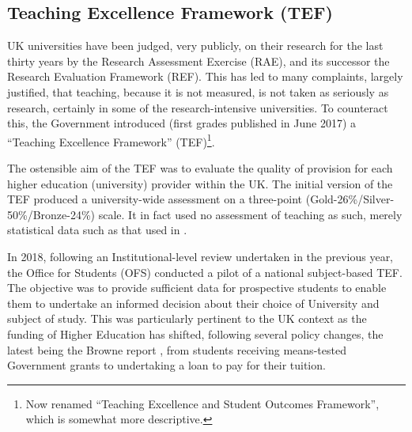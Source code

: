 \documentclass[sigconf]{acmart}
\begin{document}

\subsection{Teaching Excellence Framework (TEF)}

UK universities have been judged, very publicly, on their research
for the last thirty years by the Research Assessment Exercise (RAE), and its successor the Research Evaluation Framework (REF). This has led to many complaints, largely justified, that teaching, because it is not measured, is not taken as seriously as research, certainly in some of the research-intensive universities. 
To counteract this, the Government introduced (first grades published in June 2017) a ``Teaching Excellence Framework'' (TEF)\footnote{Now renamed ``Teaching Excellence and Student Outcomes Framework'', which is somewhat more descriptive.}. 

\iffalse

The ostensible aim of the TEF was to evaluate the quality of provision
for each higher education (university) provider within the UK.
The initial version of the TEF produced a university-wide assessment on a three-point (Gold-26\%/Silver-50\%/Bronze-24\%) scale. It in fact used no assessment of teaching as such, merely statistical data such as that used in \cite{Shadbolt2016a}.

In 2018, following an Institutional-level review undertaken in the previous year, the Office for Students (OFS) conducted a pilot of a national  subject-based TEF. The objective was to provide sufficient data for prospective students to enable them to undertake an informed decision about their choice of University and subject of study. This was particularly pertinent to the UK context as the funding of Higher Education has shifted, following several policy changes, the latest being the
Browne report \cite{BIS2010a}, from students receiving means-tested Government grants to undertaking a loan to pay for their tuition. %
\end{document}
